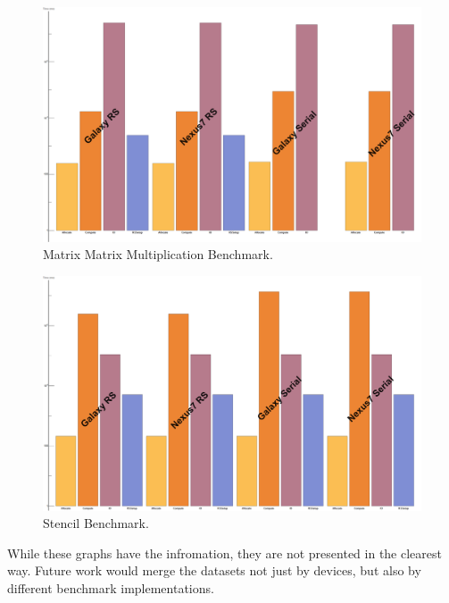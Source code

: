\begin{figure}[t!]
\includegraphics[scale=0.125]{Sgemm.png}
\caption{Matrix Matrix Multiplication Benchmark.}
\label{fig:schedule}
\centering
\end{figure}



\begin{figure}[t!]
\includegraphics[scale=0.125]{Stencil.png}
\caption{Stencil Benchmark.}
\label{fig:schedule}
\centering
\end{figure}


While these graphs have the infromation, they are not presented in the clearest way.
Future work would merge the datasets not just by devices, but also by different benchmark implementations.

